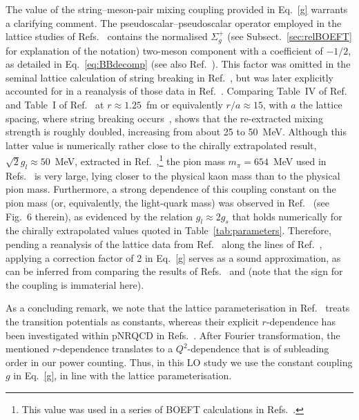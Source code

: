 \documentclass[aps,prd,showpacs,amsmath,twocolumn,superscriptaddress,floatfix,nofootinbib,notitlepage]{revtex4-2}
\begin{document}
The value of the string--meson-pair mixing coupling provided in Eq.~\eqref{g} warrants a clarifying comment. The pseudoscalar--pseudoscalar operator employed in the lattice studies of Refs.~\cite{Bali:2005fu,Bulava:2019iut,Bulava:2024jpj} contains the normalised $\Sigma_g^+$ (see Subsect.~\ref{sec:relBOEFT} for explanation of the notation) two-meson component with a coefficient of $-1/2$, as detailed in Eq.~\eqref{eq:BBdecomp} (see also Ref.~\cite{Bruschini:2023zkb}). This factor was omitted in the seminal lattice calculation of string breaking in Ref.~\cite{Bali:2005fu}, but was later explicitly accounted for in a reanalysis of those data in Ref.~\cite{Bicudo:2019ymo}. Comparing Table~IV of Ref.~\cite{Bicudo:2019ymo} and Table~I of Ref.~\cite{Bali:2005fu} at $r\approx1.25$~fm or equivalently $r/a\approx 15$, with $a$ the lattice spacing, where string breaking occurs~\cite{Bali:2005fu}, shows that the re-extracted mixing strength is roughly doubled, increasing from about 25 to 50~MeV.
Although this latter value is numerically rather close to the chirally extrapolated result, $\sqrt{2}g_l\approx 50$~MeV, extracted in Ref.~\cite{Bulava:2019iut},\footnote{This value was used in a series of BOEFT calculations in Refs.~\cite{Brambilla:2024imu,Brambilla:2026zfw,Brambilla:2026jqz,Alasiri:2026vfz,Brambilla:2026ujo}.} the pion mass $m_\pi=654$~MeV used in Refs.~\cite{Bali:2005fu,Bicudo:2019ymo} is very large, lying closer to the physical kaon mass than to the physical pion mass. Furthermore, a strong dependence of this coupling constant on the pion mass (or, equivalently, the light-quark mass) was observed in Ref.~\cite{Bulava:2019iut} (see Fig.~6 therein), as evidenced by the relation $g_l\approx 2g_s$ that holds numerically for the chirally extrapolated values quoted in Table~\ref{tab:parameters}.
Therefore, pending a reanalysis of the lattice data from Ref.~\cite{Bulava:2024jpj} along the lines of Ref.~\cite{Bicudo:2019ymo}, applying a correction factor of 2 in Eq.~\eqref{g} serves as a sound approximation, as can be inferred from comparing the results of Refs.~\cite{Bicudo:2019ymo} and \cite{Bali:2005fu} (note that the sign for the coupling is immaterial here).

As a concluding remark, we note that the lattice parameterisation in Ref.~\cite{Bulava:2024jpj} treats the transition potentials as constants, whereas their explicit $r$-dependence has been investigated within pNRQCD in Refs.~\cite{TarrusCastella:2022rxb,Berwein:2024ztx,Brambilla:2024imu}. 
After Fourier transformation, the mentioned $r$-dependence translates to a $Q^2$-dependence that is of subleading order in our power counting.
Thus, in this LO study we use the constant coupling $g$ in Eq.~\eqref{g}, in line
with the lattice parameterisation.
\end{document}
